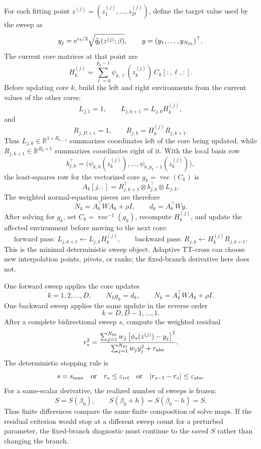 \documentclass[11pt]{article}
\newcommand{\R}{\mathbb R}
\newcommand{\vecop}{\operatorname{vec}}
\begin{document}
For each fitting point \(z^{(j)}=(z^{(j)}_1,\ldots,z^{(j)}_D)\), define the
target value used by the sweep as
\[
    y_j
    =
    e^{c_t/2}\sqrt{\widetilde q_t(z^{(j)};\beta)},
    \qquad
    y=(y_1,\ldots,y_{N_{\rm fit}})^\top.
    \label{eq:p24-p23-sweep1a}
\]
The current core matrices at that point are
\[
    H_k^{(j)}
    =
    \sum_{\ell=0}^{p_k-1}
    \psi_{k,\ell}(z_k^{(j)})\,C_k[:,\ell,:].
    \label{eq:p24-p23-sweep1b}
\]
Before updating core \(k\), build the left and right environments from the
current values of the other cores:
\[
    L_{j,1}=1,\qquad
    L_{j,k+1}=L_{j,k}H_k^{(j)},
    \label{eq:p24-p23-sweep1c}
\]
and
\[
    R_{j,D+1}=1,\qquad
    R_{j,k}=H_k^{(j)}R_{j,k+1}.
    \label{eq:p24-p23-sweep1d}
\]
Thus \(L_{j,k}\in\R^{1\times R_{k-1}}\) summarizes coordinates left of the
core being updated, while \(R_{j,k+1}\in\R^{R_k\times1}\) summarizes
coordinates right of it.  With the local basis row
\[
    b_{j,k}^\top
    =
    \bigl(\psi_{k,0}(z_k^{(j)}),\ldots,
    \psi_{k,p_k-1}(z_k^{(j)})\bigr),
    \label{eq:p24-p23-sweep1e}
\]
the least-squares row for the vectorized core \(g_k=\vecop(C_k)\) is
\[
    A_k[j,:]
    =
    R_{j,k+1}^{\top}\otimes b_{j,k}^\top\otimes L_{j,k}.
    \label{eq:p24-p23-sweep1f}
\]
The weighted normal-equation pieces are therefore
\[
    N_k=A_k^\top W A_k+\rho I,
    \qquad
    d_k=A_k^\top W y.
    \label{eq:p24-p23-sweep1g}
\]
After solving for \(g_k\), set \(C_k=\vecop^{-1}(g_k)\), recompute
\(H_k^{(j)}\), and update the affected environment before moving to the next
core:
\[
    \text{forward pass: }L_{j,k+1}\leftarrow L_{j,k}H_k^{(j)},
    \qquad
    \text{backward pass: }R_{j,k}\leftarrow H_k^{(j)}R_{j,k+1}.
    \label{eq:p24-p23-sweep1h}
\]
This is the minimal deterministic sweep object.  Adaptive TT-cross can choose
new interpolation points, pivots, or ranks; the fixed-branch derivative here
does not.

One forward sweep applies the core updates
\[
    k=1,2,\ldots,D,
    \qquad
    N_k g_k=d_k,
    \qquad
    N_k=A_k^\top W A_k+\rho I.
    \label{eq:p24-p23-sweep2}
\]
One backward sweep applies the same update in the reverse order
\[
    k=D,D-1,\ldots,1.
    \label{eq:p24-p23-sweep3}
\]
After a complete bidirectional sweep \(s\), compute the weighted residual
\[
    r_s^2
    =
    \frac{\sum_{j=1}^{N_{\rm fit}}w_j
    \left[\phi_s(z^{(j)})-y_j\right]^2}
    {\sum_{j=1}^{N_{\rm fit}}w_j y_j^2+\varepsilon_{\rm abs}}.
    \label{eq:p24-p23-sweep4}
\]
The deterministic stopping rule is
\[
    s=s_{\max}\quad\text{or}\quad
    r_s\le \varepsilon_{\rm rel}
    \quad\text{or}\quad
    |r_{s-1}-r_s|\le \varepsilon_{\rm abs}.
    \label{eq:p24-p23-sweep5}
\]
For a same-scalar derivative, the realized number of sweeps is frozen:
\[
    S=S(\beta_0),
    \qquad
    S(\beta_0+h)=S(\beta_0-h)=S.
    \label{eq:p24-p23-sweep6}
\]
Thus finite differences compare the same finite composition of solve maps.
If the residual criterion would stop at a different sweep count for a
perturbed parameter, the fixed-branch diagnostic must continue to the saved
\(S\) rather than changing the branch.
\end{document}
